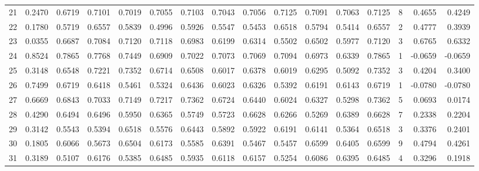 \begin{tabular}{lrrrrrrrrrrrrrrr}
21  &      0.2470 &  0.6719 &  0.7101 &  0.7019 &  0.7055 &  0.7103 &  0.7043 &  0.7056 &  0.7125 &  0.7091 &   0.7063 &     0.7125 &      8 &                    0.4655 &                     0.4249 \\
22  &      0.1780 &  0.5719 &  0.6557 &  0.5839 &  0.4996 &  0.5926 &  0.5547 &  0.5453 &  0.6518 &  0.5794 &   0.5414 &     0.6557 &      2 &                    0.4777 &                     0.3939 \\
23  &      0.0355 &  0.6687 &  0.7084 &  0.7120 &  0.7118 &  0.6983 &  0.6199 &  0.6314 &  0.5502 &  0.6502 &   0.5977 &     0.7120 &      3 &                    0.6765 &                     0.6332 \\
24  &      0.8524 &  0.7865 &  0.7768 &  0.7449 &  0.6909 &  0.7022 &  0.7073 &  0.7069 &  0.7094 &  0.6973 &   0.6339 &     0.7865 &      1 &                   -0.0659 &                    -0.0659 \\
25  &      0.3148 &  0.6548 &  0.7221 &  0.7352 &  0.6714 &  0.6508 &  0.6017 &  0.6378 &  0.6019 &  0.6295 &   0.5092 &     0.7352 &      3 &                    0.4204 &                     0.3400 \\
26  &      0.7499 &  0.6719 &  0.6418 &  0.5461 &  0.5324 &  0.6436 &  0.6023 &  0.6326 &  0.5392 &  0.6191 &   0.6143 &     0.6719 &      1 &                   -0.0780 &                    -0.0780 \\
27  &      0.6669 &  0.6843 &  0.7033 &  0.7149 &  0.7217 &  0.7362 &  0.6724 &  0.6440 &  0.6024 &  0.6327 &   0.5298 &     0.7362 &      5 &                    0.0693 &                     0.0174 \\
28  &      0.4290 &  0.6494 &  0.6496 &  0.5950 &  0.6365 &  0.5749 &  0.5723 &  0.6628 &  0.6266 &  0.5269 &   0.6389 &     0.6628 &      7 &                    0.2338 &                     0.2204 \\
29  &      0.3142 &  0.5543 &  0.5394 &  0.6518 &  0.5576 &  0.6443 &  0.5892 &  0.5922 &  0.6191 &  0.6141 &   0.5364 &     0.6518 &      3 &                    0.3376 &                     0.2401 \\
30  &      0.1805 &  0.6066 &  0.5673 &  0.6504 &  0.6173 &  0.5585 &  0.6391 &  0.5467 &  0.5457 &  0.6599 &   0.6405 &     0.6599 &      9 &                    0.4794 &                     0.4261 \\
31  &      0.3189 &  0.5107 &  0.6176 &  0.5385 &  0.6485 &  0.5935 &  0.6118 &  0.6157 &  0.5254 &  0.6086 &   0.6395 &     0.6485 &      4 &                    0.3296 &                     0.1918 \\

\end{tabular}
